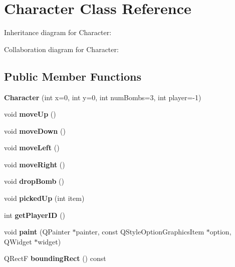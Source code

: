 \hypertarget{class_character}{\section{Character Class Reference}
\label{class_character}
}


Inheritance diagram for Character\-:


Collaboration diagram for Character\-:
\subsection*{Public Member Functions}
\begin{DoxyCompactItemize}
\item 
\hypertarget{class_character_ade1bb6dc548f73fb814702776457a1f3}{{\bfseries Character} (int x=0, int y=0, int num\-Bombs=3, int player=-\/1)}\label{class_character_ade1bb6dc548f73fb814702776457a1f3}

\item 
\hypertarget{class_character_a5e63747ea61305391cd0ada0898e485c}{void {\bfseries move\-Up} ()}\label{class_character_a5e63747ea61305391cd0ada0898e485c}

\item 
\hypertarget{class_character_afa7763e81bca6a0b9b0c044f39c429f0}{void {\bfseries move\-Down} ()}\label{class_character_afa7763e81bca6a0b9b0c044f39c429f0}

\item 
\hypertarget{class_character_a88dfc867ab226d3f115b891fc3b34d67}{void {\bfseries move\-Left} ()}\label{class_character_a88dfc867ab226d3f115b891fc3b34d67}

\item 
\hypertarget{class_character_a0a8bf66e3d70c196a0fa8ce183f4aeb4}{void {\bfseries move\-Right} ()}\label{class_character_a0a8bf66e3d70c196a0fa8ce183f4aeb4}

\item 
\hypertarget{class_character_a38747fb2a1e186e6cc871f0836eb83e8}{void {\bfseries drop\-Bomb} ()}\label{class_character_a38747fb2a1e186e6cc871f0836eb83e8}

\item 
\hypertarget{class_character_acb99685904de8dce448ad8a51efed7cb}{void {\bfseries picked\-Up} (int item)}\label{class_character_acb99685904de8dce448ad8a51efed7cb}

\item 
\hypertarget{class_character_aacb2a15ce71f1165daceb29cf481a4cb}{int {\bfseries get\-Player\-I\-D} ()}\label{class_character_aacb2a15ce71f1165daceb29cf481a4cb}

\item 
\hypertarget{class_character_a099916c7331625461d7cd976ec4b0498}{void {\bfseries paint} (Q\-Painter $\ast$painter, const Q\-Style\-Option\-Graphics\-Item $\ast$option, Q\-Widget $\ast$widget)}\label{class_character_a099916c7331625461d7cd976ec4b0498}

\item 
\hypertarget{class_character_af3bf8c7fe7ddbad47b54193374d25ee2}{Q\-Rect\-F {\bfseries bounding\-Rect} () const }\label{class_character_af3bf8c7fe7ddbad47b54193374d25ee2}

\end{DoxyCompactItemize}


